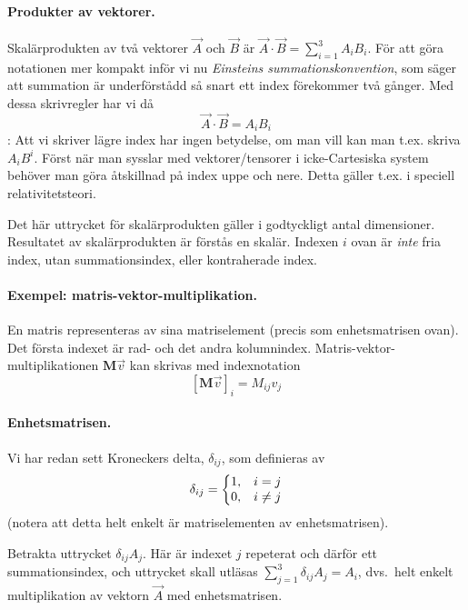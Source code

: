 \documentclass[%
oneside,                 %
final,                   %
10pt]{article}
\newcommand{\longinlinecomment}[3]{{\color{red}{\bf #1}: #2}}
\begin{document}
\paragraph{Produkter av vektorer.}
Skalärprodukten av två vektorer $\vec{A}$ och $\vec{B}$ är $\vec{A}\cdot\vec{B}=\sum_{i=1}^3A_iB_i$. För att göra notationen mer kompakt inför vi nu \emph{Einsteins summationskonvention}, som säger att summation är underförstådd så snart ett index förekommer två gånger. Med dessa skrivregler har vi då
\begin{equation}
\vec{A}\cdot\vec{B}=A_iB_i
\end{equation}
\longinlinecomment{Comment 1}{ Att vi skriver lägre index har ingen betydelse, om man vill kan man t.ex. skriva $A_iB^i$. Först när man sysslar med vektorer/tensorer i icke-Cartesiska system behöver man göra åtskillnad på index uppe och nere. Detta gäller t.ex. i speciell relativitetsteori. }{ Att vi skriver lägre }

Det här uttrycket för skalärprodukten gäller i godtyckligt antal dimensioner. Resultatet av skalärprodukten är förstås en skalär. Indexen $i$ ovan är \emph{inte} fria index, utan summationsindex, eller kontraherade index. 

\paragraph{Exempel: matris-vektor-multiplikation.}
En matris representeras av sina matriselement (precis som enhetsmatrisen ovan). Det första indexet är rad- och det andra kolumnindex. Matris-vektor-multiplikationen $\mathbf{M} \vec{v}$ kan skrivas med indexnotation
\begin{equation}
\left[ \mathbf{M} \vec{v} \right]_i = M_{ij} v_j
\end{equation}

\paragraph{Enhetsmatrisen.}
Vi har redan sett Kroneckers delta, $\delta_{ij}$, som definieras av
\begin{equation}
\delta_{ij}=\left\{
\begin{matrix}
1,&i=j\cr
0,&i\neq j\cr
\end{matrix}
\right.
\end{equation}
(notera att detta helt enkelt är matriselementen av enhetsmatrisen).

Betrakta uttrycket $\delta_{ij}A_j$. Här är indexet $j$ repeterat och därför ett summationsindex, och uttrycket skall utläsas $\sum_{j=1}^3\delta_{ij}A_j=A_i$, dvs.~helt enkelt multiplikation av vektorn $\vec{A}$ med enhetsmatrisen.
\end{document}
